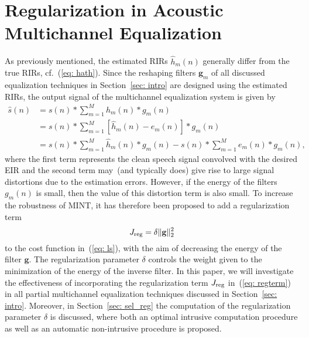 \documentclass[draftcls,onecolumn,11pt]{IEEEtran}
\begin{document}
\section{Regularization in Acoustic Multichannel Equalization}
\label{sec: reg}
As previously mentioned, the estimated RIRs $\hat{h}_m(n)$ generally differ from the true RIRs, cf.~(\ref{eq: hath}).
Since the reshaping filters $\mathbf{g}_m$ of all discussed equalization techniques in Section~\ref{sec: intro} are designed using the estimated RIRs, the output signal of the multichannel equalization system is given by
\begin{align}
\hat{s}(n)  &= s(n) \ast \sum_{m=1}^M h_m(n) \ast g_m(n) \\
& = s(n) \ast \sum_{m=1}^M  \left[\hat{h}_m(n) - e_m(n)\right] \ast g_m(n) \\
\label{eq: 2}
& = s(n) \ast \sum_{m=1}^M \hat{h}_m(n) \ast g_m(n) - s(n) \ast \sum_{m=1}^M e_m(n) \ast g_m(n),
\end{align}
where the first term represents the clean speech signal convolved with the desired EIR and the second term may~(and typically does) give rise to large signal distortions due to the estimation errors.
However, if the energy of the filters $g_m(n)$ is small, then the value of this distortion term is also small.
To increase the robustness of MINT, it has therefore been proposed to add a regularization term
\begin{equation}
\label{eq: regterm}
J_{\rm reg} = \delta \|\mathbf{g}\|_2^2
\end{equation}
to the cost function in~(\ref{eq: ls}), with the aim of decreasing the energy of the filter $\mathbf{g}$.
The regularization parameter $\delta$ controls the weight given to the minimization of the energy of the inverse filter.
In this paper, we will investigate the effectiveness of incorporating the regularization term $J_{\rm reg}$ in~(\ref{eq: regterm}) in all partial multichannel equalization techniques discussed in Section~\ref{sec: intro}.
Moreover, in Section~\ref{sec: sel_reg} the computation of the regularization parameter $\delta$ is discussed, where both an optimal intrusive computation procedure as well as an automatic non-intrusive procedure is proposed.
\end{document}
